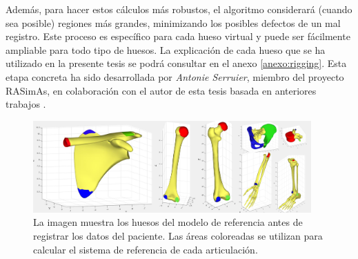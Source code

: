  Además, para hacer estos cálculos más robustos, el algoritmo considerará (cuando sea posible) regiones más grandes, minimizando los posibles defectos de un mal registro. Este proceso es específico para cada hueso virtual y puede ser fácilmente ampliable para todo tipo de huesos. La explicación de cada hueso que se ha utilizado en la presente tesis se podrá consultar en el anexo \ref{anexo:rigging}. 
Esta etapa concreta ha sido desarrollada por \emph{Antonie Serruier}, miembro del proyecto \ac{RASimAs}, en colaboración con el autor de esta tesis basada en anteriores trabajos \cite{QUIJANO20131703}.

\begin{figure}
   \centering
    \includegraphics[width=0.95\textwidth]{IMG/rigshoulder.png}%
    \caption{La imagen muestra los huesos del modelo de referencia antes de registrar los datos del paciente. Las áreas coloreadas se utilizan para calcular el sistema de referencia de cada articulación. }
\label{fig:humero}
\end{figure}


